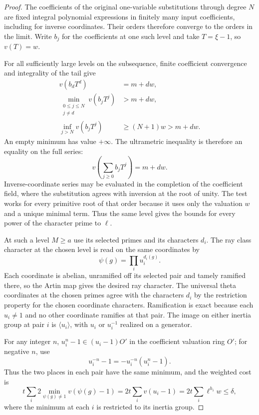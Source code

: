 \begin{proof}
The coefficients of the original one-variable substitutions
through degree \(N\) are fixed integral polynomial expressions
in finitely many input coefficients, including for inverse
coordinates. Their orders therefore converge to the orders in
the limit. Write \(b_j\) for the coefficients at one such level and take
\(T=\xi-1\), so \(v(T)=w\).

For all sufficiently large levels on
the subsequence, finite coefficient convergence and integrality
of the tail give
\[
 \begin{aligned}
 v(b_dT^d)&=m+dw,\\
 \min_{\substack{0\le j\le N\\j\ne d}}v(b_jT^j)&>m+dw,\\
 \inf_{j>N}v(b_jT^j)&\ge (N+1)w>m+dw .
 \end{aligned}
\]
An empty minimum has value \(+\infty\). The ultrametric inequality is
therefore an equality on the full series:
\[
 v(\sum_{j\ge0}b_jT^j)=m+dw.
\]
Inverse-coordinate series may be evaluated in the
completion of the coefficient field, where the substitution
agrees with inversion at the root of unity. The test works
for every primitive root of that order because it uses only
the valuation \(w\) and a unique minimal term. Thus the same
level gives the bounds for every power of the character prime
to \(\ell\).

At such a level \(M\ge a\) use its selected primes and its
characters \(d_i\). The ray class character at the chosen level is read on the same coordinates by
\[
 \psi(g)=\prod_i u_i^{d_i(g)}.
\]
Each coordinate is abelian, unramified off its selected pair and tamely ramified there, so the Artin map gives the desired ray character. The universal theta coordinates at the chosen primes agree with the characters \(d_i\) by the restriction property for the chosen coordinate characters. Ramification is exact because each \(u_i\ne1\)
and no other coordinate ramifies at that pair. The image on either inertia group at pair \(i\) is
\(\langle u_i\rangle\), with \(u_i\) or \(u_i^{-1}\) realized
on a generator.

For any integer \(n\),
\(u_i^n-1\in(u_i-1)O'\) in the coefficient valuation ring
\(O'\); for negative \(n\), use
\[
 u_i^{-n}-1=-u_i^{-n}(u_i^n-1).
\]
Thus the two places in
each pair have the same minimum, and the weighted cost is
\[
  t\sum_i 2\min_{\psi(g)\ne1}v(\psi(g)-1)
      =2t\sum_i v(u_i-1)
      =2t\sum_i\ell^{h_i}w \le \delta ,
\]
where the minimum at each \(i\) is restricted to its inertia
group.


\end{proof}
